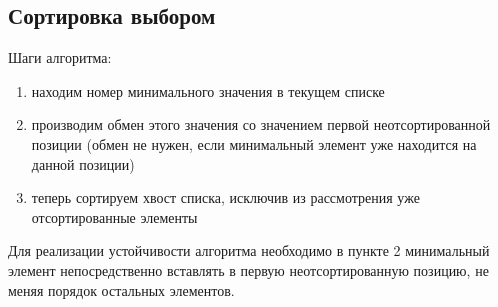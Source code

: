 \documentclass[a4paper,12pt]{article}
\begin{document}
\subsection{Сортировка выбором}

Шаги алгоритма:
\begin{enumerate}
    \item находим номер минимального значения в текущем списке
    \item производим обмен этого значения со значением первой неотсортированной позиции (обмен не нужен, если минимальный элемент уже находится на данной позиции)
    \item теперь сортируем хвост списка, исключив из рассмотрения уже отсортированные элементы
\end{enumerate}
Для реализации устойчивости алгоритма необходимо в пункте 2 минимальный элемент непосредственно вставлять в первую неотсортированную позицию, не меняя порядок остальных элементов. 

    \newpage
\end{document}
